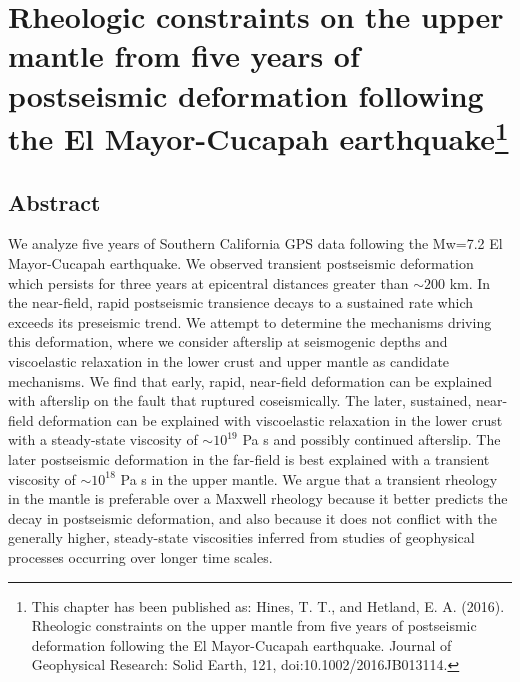\chapter
[Rheologic constraints on the upper mantle from five years of
postseismic deformation following the El Mayor-Cucapah earthquake]
{Rheologic constraints on the upper mantle from five years of
postseismic deformation following the El Mayor-Cucapah earthquake\footnote[1]{
This chapter has been published as: Hines, T. T., and Hetland, E. A.
(2016). Rheologic constraints on the upper mantle from five years of
postseismic deformation following the El Mayor-Cucapah earthquake.
Journal of Geophysical Research: Solid Earth, 121,
doi:10.1002/2016JB013114.}}

\section{Abstract}
We analyze five years of Southern California GPS data following the
Mw=7.2 El Mayor-Cucapah earthquake.  We observed transient postseismic
deformation which persists for three years at epicentral distances
greater than ${\sim}200$ km.  In the near-field, rapid postseismic
transience decays to a sustained rate which exceeds its preseismic
trend.  We attempt to determine the mechanisms driving this
deformation, where we consider afterslip at seismogenic depths and
viscoelastic relaxation in the lower crust and upper mantle as
candidate mechanisms.  We find that early, rapid, near-field
deformation can be explained with afterslip on the fault that ruptured
coseismically. The later, sustained, near-field deformation can be
explained with viscoelastic relaxation in the lower crust with a
steady-state viscosity of ${\sim}10^{19}$ Pa s and possibly continued
afterslip.  The later postseismic deformation in the far-field is best
explained with a transient viscosity of ${\sim}10^{18}$ Pa s in the
upper mantle. We argue that a transient rheology in the mantle is
preferable over a Maxwell rheology because it better predicts the
decay in postseismic deformation, and also because it does not
conflict with the generally higher, steady-state viscosities inferred
from studies of geophysical processes occurring over longer time
scales.

